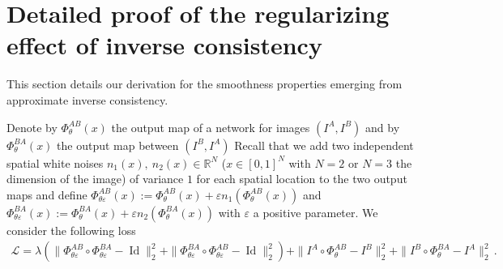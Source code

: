 \documentclass[10pt,onecolumn,letterpaper]{article} %
\newcommand{\fxpsi}{\Phi_{\theta}^{BA}}
\newcommand{\fxvarphi}{\Phi_{\theta}^{AB}}
\newcommand{\fxpsivarepsilon}{\Phi_{\theta \varepsilon}^{BA}}
\newcommand{\fxvarphivarepsilon}{\Phi_{\theta \varepsilon}^{AB}}
\begin{document}
\section{Detailed proof of the regularizing effect of inverse consistency}

This section details our derivation for the smoothness properties emerging from approximate inverse consistency. 


Denote by $\fxvarphi(x)$ the output map of a network for images $(I^A,I^B)$ and by $\fxpsi(x)$ the output map between $(I^B,I^A)$
Recall that we add two independent spatial white noises $n_1(x),~n_2(x)\in\mathbb{R}^N$ ($x \in [0,1]^N$ with $N = 2$ or $N = 3$ the dimension of the image)
of variance $1$ for each spatial location to the two output maps and define $\fxvarphivarepsilon(x) := \fxvarphi(x) + \varepsilon n_1(\fxvarphi(x))$ and $\fxpsivarepsilon(x) := \fxpsi(x) + \varepsilon n_2(\fxpsi(x))$ with $\varepsilon$ a positive parameter.
We consider the following loss
\begin{multline}\label{EqLossSymmetric2}
    \mathcal{L} =\lambda \left( \| \fxvarphivarepsilon \circ \fxpsivarepsilon - \operatorname{Id} \|^2_2 + \| \fxpsivarepsilon \circ \fxvarphivarepsilon - \operatorname{Id} \|^2_2 \right) + \| I^A \circ \fxvarphi - I^B \|^2_2 + \| I^B \circ \fxpsi  - I^A \|^2_2\,.
\end{multline}
\end{document}
